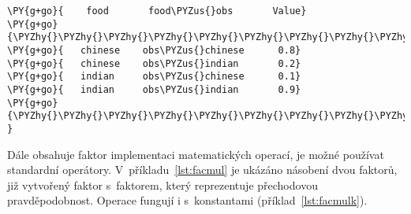 \begin{example}
\begin{Verbatim}[commandchars=\\\{\}]
\PY{g+go}{    food       food\PYZus{}obs       Value}
\PY{g+go}{\PYZhy{}\PYZhy{}\PYZhy{}\PYZhy{}\PYZhy{}\PYZhy{}\PYZhy{}\PYZhy{}\PYZhy{}\PYZhy{}\PYZhy{}\PYZhy{}\PYZhy{}\PYZhy{}\PYZhy{}\PYZhy{}\PYZhy{}\PYZhy{}\PYZhy{}\PYZhy{}\PYZhy{}\PYZhy{}\PYZhy{}\PYZhy{}\PYZhy{}\PYZhy{}\PYZhy{}\PYZhy{}\PYZhy{}\PYZhy{}\PYZhy{}\PYZhy{}\PYZhy{}\PYZhy{}\PYZhy{}\PYZhy{}\PYZhy{}\PYZhy{}\PYZhy{}\PYZhy{}}
\PY{g+go}{   chinese    obs\PYZus{}chinese      0.8}
\PY{g+go}{   chinese    obs\PYZus{}indian       0.2}
\PY{g+go}{   indian     obs\PYZus{}chinese      0.1}
\PY{g+go}{   indian     obs\PYZus{}indian       0.9}
\PY{g+go}{\PYZhy{}\PYZhy{}\PYZhy{}\PYZhy{}\PYZhy{}\PYZhy{}\PYZhy{}\PYZhy{}\PYZhy{}\PYZhy{}\PYZhy{}\PYZhy{}\PYZhy{}\PYZhy{}\PYZhy{}\PYZhy{}\PYZhy{}\PYZhy{}\PYZhy{}\PYZhy{}\PYZhy{}\PYZhy{}\PYZhy{}\PYZhy{}\PYZhy{}\PYZhy{}\PYZhy{}\PYZhy{}\PYZhy{}\PYZhy{}\PYZhy{}\PYZhy{}\PYZhy{}\PYZhy{}\PYZhy{}\PYZhy{}\PYZhy{}\PYZhy{}\PYZhy{}\PYZhy{}              }
\end{Verbatim}
\caption{Zobrazení faktorů}
\label{lst:facprt}
\end{example}



Dále obsahuje faktor implementaci matematických operací, je možné používat standardní operátory.
V~příkladu~\ref{lst:facmul} je ukázáno násobení dvou faktorů, již vytvořený faktor s~faktorem, který reprezentuje přechodovou pravděpodobnost.
Operace fungují i s~konstantami (příklad~\ref{lst:facmulk}).


